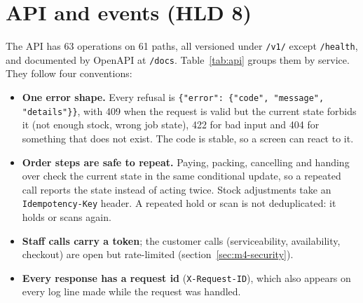 \section{API and events (HLD 8)}

The API has 63 operations on 61 paths, all versioned under \texttt{/v1/} except \texttt{/health}, and documented by
OpenAPI at \texttt{/docs}.
Table~\ref{tab:api} groups them by service. They follow four conventions:
\begin{itemize}
  \item \textbf{One error shape.} Every refusal is \verb|{"error": {"code", "message", "details"}}|, with 409 when
    the request is valid but the current state forbids it (not enough stock, wrong job state), 422 for bad input and
    404 for something that does not exist. The code is stable, so a screen can react to it.
  \item \textbf{Order steps are safe to repeat.} Paying, packing, cancelling and handing over check the current state
    in the same conditional update, so a repeated call reports the state instead of acting twice. Stock adjustments
    take an \texttt{Idempotency-Key} header. A repeated hold or scan is not deduplicated: it holds or scans again.
  \item \textbf{Staff calls carry a token}; the customer calls (serviceability, availability, checkout) are open but
    rate-limited (section~\ref{sec:m4-security}).
  \item \textbf{Every response has a request id} (\texttt{X-Request-ID}), which also appears on every log line made
    while the request was handled.
\end{itemize}

